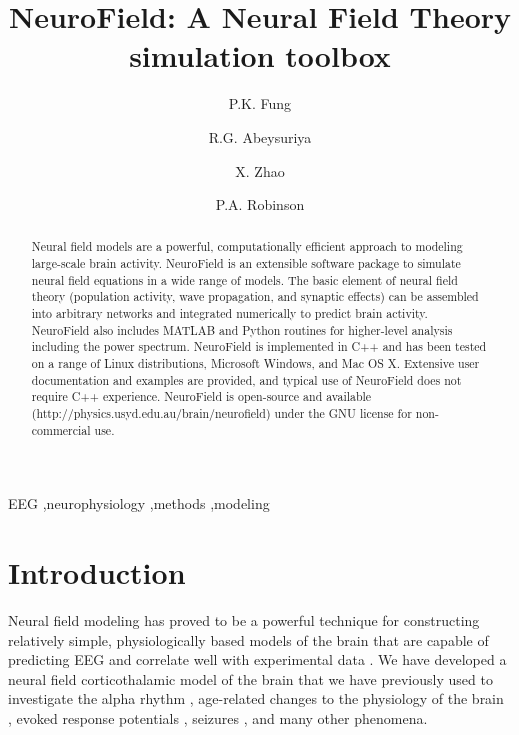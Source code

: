 \documentclass[preprint,review,10pt,authoryear,letterpaper]{elsarticle}
\begin{document}
\begin{frontmatter}

\title{NeuroField: A Neural Field Theory simulation toolbox}


\author{P.K. Fung}
\author{R.G. Abeysuriya\corref{}}
\author{X. Zhao\corref{}}

\author{P.A. Robinson\corref{}}

\address{School of Physics, University of Sydney, New South Wales, Australia}


\begin{abstract}
Neural field models are a powerful, computationally efficient approach to modeling large-scale brain activity. NeuroField is an extensible software package to simulate neural field equations in a wide range of models. The basic element of neural field theory (population activity, wave propagation, and synaptic effects) can be assembled into arbitrary networks and integrated numerically to predict brain activity. NeuroField also includes MATLAB and Python routines for higher-level analysis including the power spectrum. NeuroField is implemented in C++ and has been tested on a range of Linux distributions, Microsoft Windows, and Mac OS X. Extensive user documentation and examples are provided, and typical use of NeuroField does not require C++ experience. NeuroField is open-source and available (http://physics.usyd.edu.au/brain/neurofield) under the GNU license for non-commercial use. 
\end{abstract}

\begin{keyword}
EEG \sep neurophysiology \sep methods \sep modeling

\end{keyword}

\end{frontmatter}

\linenumbers

\section{Introduction}
\label{sec:introduction}
Neural field modeling has proved to be a powerful technique for constructing relatively simple, physiologically based models of the brain that are capable of predicting EEG and correlate well with experimental data \cite{Deco2008,Pinotsis2012}. We have developed a neural field corticothalamic model of the brain \citep{Robinson2005,Rowe2004413,PhysRevE.63.021903,PhysRevE.65.041924,Robinson:04aa} that we have previously used to investigate the alpha rhythm \citep{PhysRevE.68.021922,PhysRevE.70.011911}, age-related changes to the physiology of the brain \citep{VanAlbada2010}, evoked response potentials \citep{Rennie2002,ker11}, seizures \citep{Breakspear2006}, and many other phenomena. 
\end{document}
